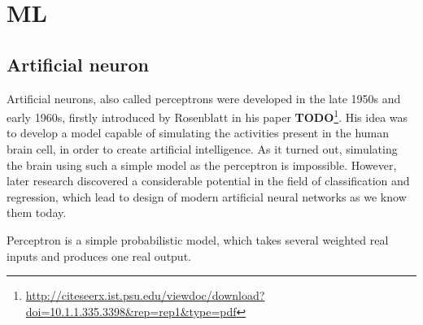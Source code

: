 \chapter{ML}

\section{Artificial neuron}

Artificial neurons, also called perceptrons were developed in the late 1950s and early 1960s, firstly introduced by Rosenblatt in his paper \textbf{TODO}\footnote{\url{http://citeseerx.ist.psu.edu/viewdoc/download?doi=10.1.1.335.3398&rep=rep1&type=pdf}}. His idea was to develop a model capable of simulating the activities present in the human brain cell, in order to create artificial intelligence. As it turned out, simulating the brain using such a simple model as the perceptron is impossible. However, later research discovered a considerable potential in the field of classification and regression, which lead to design of modern artificial neural networks as we know them today.

Perceptron is a simple probabilistic model, which takes several weighted real inputs and produces one real output.

\vspace{3mm}

